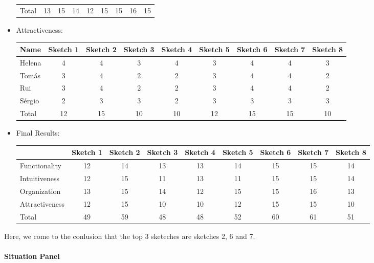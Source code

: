 \begin{itemize}
\begin{table}[H]
\begin{tabular}{l*{8}{c}}
        \hline 
        Total & 13 & 15 & 14 & 12 & 15 & 15 & 16 & 15 \\
    \end{tabular}
    \end{table}
\item Attractiveness:
    \begin{table}[H]
        \begin{tabular}{l*{8}{c}}
            Name & Sketch 1 & Sketch 2 & Sketch 3 
            & Sketch 4 & Sketch 5 & Sketch 6 & Sketch 7 
            & Sketch 8 \\
            \hline 
            Helena & 4 & 4 & 3 & 4 & 3 & 4 & 4 & 3 \\ 
            Tomás & 3 & 4 & 2 & 2 & 3 & 4 & 4 & 2 \\ 
            Rui & 3 & 4 & 2 & 2 & 3 & 4 & 4 & 2 \\ 
            Sérgio & 2 & 3 & 3 & 2 & 3 & 3 & 3 & 3 \\ 
            \hline 
            Total & 12 & 15 & 10 & 10 & 12 & 15 & 15 & 10 \\
        \end{tabular}
        \end{table}
\item Final Results: 
\begin{table}[H]
    \begin{tabular}{l*{8}{c}}
        & Sketch 1 & Sketch 2 & Sketch 3 
        & Sketch 4 & Sketch 5 & Sketch 6 & Sketch 7 
        & Sketch 8 \\
        \hline 
        Functionality & 12 & 14 & 13 & 13 & 14 & 15 & 15 & 14 \\ 
        Intuitiveness & 12 & 15 & 11 & 13 & 11 & 15 & 15 & 14 \\ 
        Organization & 13 & 15 & 14 & 12 & 15 & 15 & 16 & 13 \\ 
        Attractiveness & 12 & 15 & 10 & 10 & 12 & 15 & 15 & 10 \\ 
        \hline 
        Total & 49 & 59 & 48 & 48 & 52 & 60 & 61 & 51 \\
    \end{tabular}
    \end{table}
\end{itemize} \par
Here, we come to the conlusion that the top 3 sketeches are
sketches 2, 6 and 7. \\\\
\textbf{Situation Panel}
